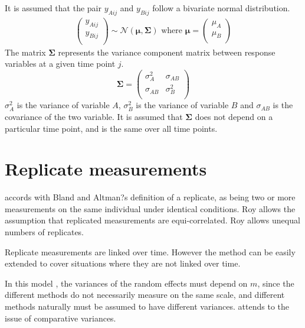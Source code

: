 \documentclass[12pt, a4paper]{report}
\theoremstyle{plain}
\theoremstyle{definition}
\theoremstyle{remark}
\begin{document}
	It is assumed that the pair $y_{Aij}$ and $y_{Bij}$ follow a bivariate normal distribution.
	\begin{eqnarray}
	\left(
	\begin{array}{c}
	y_{Aij} \\
	y_{Bij} \\
	\end{array}
	\right) \sim \mathcal{N}(
	\boldsymbol{\mu}, \boldsymbol{\Sigma})\mbox{   where } \boldsymbol{\mu} = \left(
	\begin{array}{c}
	\mu_{A} \\
	\mu_{B} \\
	\end{array}
	\right)
	\end{eqnarray}
	The matrix $\boldsymbol{\Sigma}$ represents the variance component matrix between response variables at a given time point $j$.
	\begin{equation}
	\boldsymbol{\Sigma} = \left( \begin{array}{cc}
	\sigma^2_{A} & \sigma_{AB} \\
	\sigma_{AB} & \sigma^2_{B}\\
	\end{array}\right)
	\end{equation}
	$\sigma^2_{A}$ is the variance of variable $A$, $\sigma^2_{B}$ is the variance of variable $B$ and $\sigma_{AB}$ is the covariance of the two variable. It is assumed that $\boldsymbol{\Sigma}$ does not depend on a particular time point, and is the same over all time points.
	

	\section{Replicate measurements}
	\citet{ARoy2009} accords with Bland and Altman?s definition of a replicate, as being two or more measurements on the same individual under identical conditions.
	Roy allows the assumption that replicated measurements are equi-correlated.
	Roy allows unequal numbers of replicates.
	
	Replicate measurements are linked over time. However the method can be easily extended to cover situations where they are not linked over time.
	
	
	
	In this model , the variances of the random effects must depend on
	$m$, since the different methods do not necessarily measure on the
	same scale, and different methods naturally must be assumed to
	have different variances. \citet{BXC2004} attends to the issue of
	comparative variances.
	
\end{document}
